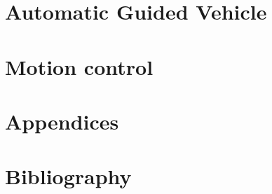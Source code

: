 
\sloppy




%
%
%
%

\part{Automatic Guided Vehicle }





\part{Motion control}

%




\part{Appendices}


\part{Bibliography}
%
%


